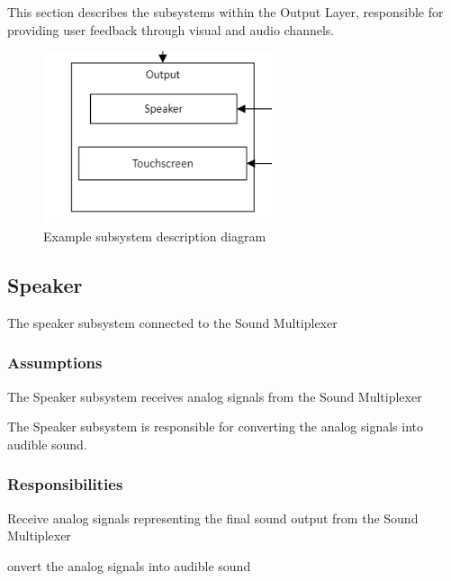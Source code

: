 This section describes the subsystems within the Output Layer, responsible for providing user feedback through visual and audio channels.

\begin{figure}[h!]
	\centering
 	\includegraphics[width=0.60\textwidth]{images/OutputSubsystem}
 \caption{Example subsystem description diagram}
\end{figure}

\subsection{Speaker}
The speaker subsystem connected to the Sound Multiplexer

\subsubsection{Assumptions}
\begin{itemize}
\begin{item}
The Speaker subsystem receives analog signals from the Sound Multiplexer
\end{item}
\begin{item}
The Speaker subsystem is responsible for converting the analog signals into audible sound.
\end{item}
\end{itemize}

\subsubsection{Responsibilities}
\begin{itemize}
\begin{item}
Receive analog signals representing the final sound output from the Sound Multiplexer 
\end{item}
\begin{item}
onvert the analog signals into audible sound
\end{item}
\end{itemize}

